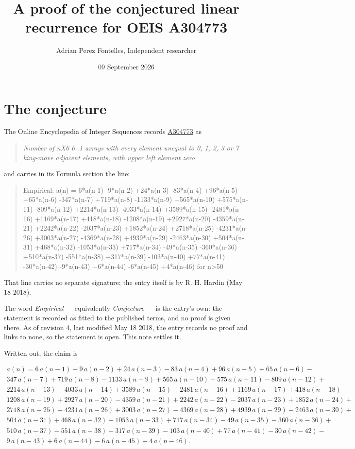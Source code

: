 \documentclass[11pt]{article}
\title{A proof of the conjectured linear recurrence for OEIS A304773}
\author{Adrian Perez Fontelles, Independent researcher}
\date{09 September 2026}
\theoremstyle{definition}
\begin{document}
\maketitle
\section{The conjecture}

The Online Encyclopedia of Integer Sequences records \href{https://oeis.org/A304773}{A304773} as

\begin{quote}\itshape Number of nX6 0..1 arrays with every element unequal to 0, 1, 2, 3 or 7 king-move adjacent elements, with upper left element zero\end{quote}

and carries in its Formula section the line:

\begin{quote}\ttfamily Empirical: a(n) = 6*a(n-1) -9*a(n-2) +24*a(n-3) -83*a(n-4) +96*a(n-5) +65*a(n-6) -347*a(n-7) +719*a(n-8) -1133*a(n-9) +565*a(n-10) +575*a(n-11) -809*a(n-12) +2214*a(n-13) -4033*a(n-14) +3589*a(n-15) -2481*a(n-16) +1169*a(n-17) +418*a(n-18) -1208*a(n-19) +2927*a(n-20) -4359*a(n-21) +2242*a(n-22) -2037*a(n-23) +1852*a(n-24) +2718*a(n-25) -4231*a(n-26) +3003*a(n-27) -4369*a(n-28) +4939*a(n-29) -2463*a(n-30) +504*a(n-31) +468*a(n-32) -1053*a(n-33) +717*a(n-34) -49*a(n-35) -360*a(n-36) +510*a(n-37) -551*a(n-38) +317*a(n-39) -103*a(n-40) +77*a(n-41) -30*a(n-42) -9*a(n-43) +6*a(n-44) -6*a(n-45) +4*a(n-46) for n>50\end{quote}

That line carries no separate signature; the entry itself is by R. H. Hardin (May 18 2018).

The word {\itshape Empirical} --- equivalently {\itshape Conjecture} --- is the entry's own: the statement is recorded as fitted to the published terms, and no proof is given there. As of revision 4, last modified May 18 2018, the entry records no proof and links to none, so the statement is open. This note settles it.

Written out, the claim is

\begin{multline*} a(n) = 6\,a(n-1) - 9\,a(n-2) + 24\,a(n-3) - 83\,a(n-4) + 96\,a(n-5) + 65\,a(n-6) - \\ 347\,a(n-7) + 719\,a(n-8) - 1133\,a(n-9) + 565\,a(n-10) + 575\,a(n-11) - 809\,a(n-12) + \\ 2214\,a(n-13) - 4033\,a(n-14) + 3589\,a(n-15) - 2481\,a(n-16) + 1169\,a(n-17) + 418\,a(n-18) - \\ 1208\,a(n-19) + 2927\,a(n-20) - 4359\,a(n-21) + 2242\,a(n-22) - 2037\,a(n-23) + 1852\,a(n-24) + \\ 2718\,a(n-25) - 4231\,a(n-26) + 3003\,a(n-27) - 4369\,a(n-28) + 4939\,a(n-29) - 2463\,a(n-30) + \\ 504\,a(n-31) + 468\,a(n-32) - 1053\,a(n-33) + 717\,a(n-34) - 49\,a(n-35) - 360\,a(n-36) + \\ 510\,a(n-37) - 551\,a(n-38) + 317\,a(n-39) - 103\,a(n-40) + 77\,a(n-41) - 30\,a(n-42) - \\ 9\,a(n-43) + 6\,a(n-44) - 6\,a(n-45) + 4\,a(n-46). \end{multline*}
\end{document}

